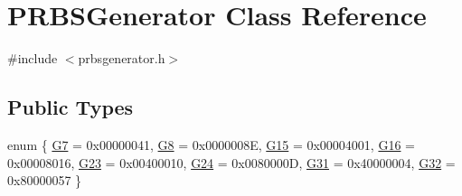 \hypertarget{classPRBSGenerator}{\section{\-P\-R\-B\-S\-Generator \-Class \-Reference}
\label{d6/db0/classPRBSGenerator}
}


{\ttfamily \#include $<$prbsgenerator.\-h$>$}

\subsection*{\-Public \-Types}
\begin{DoxyCompactItemize}
\item 
enum \{ \*
\hyperlink{classPRBSGenerator_a9c6fec99cf1a565c95e5e8488cdc4dbcacf570f7420964756a71bc150d4622563}{\-G7} =  0x00000041, 
\hyperlink{classPRBSGenerator_a9c6fec99cf1a565c95e5e8488cdc4dbca5ae6a89e9466218eeff42c23fccfc13f}{\-G8} =  0x0000008\-E, 
\hyperlink{classPRBSGenerator_a9c6fec99cf1a565c95e5e8488cdc4dbcad37981381999a9cedbcb07c5c506d7cc}{\-G15} =  0x00004001, 
\hyperlink{classPRBSGenerator_a9c6fec99cf1a565c95e5e8488cdc4dbca74d706cd120035b8ad5ade6afd4a764a}{\-G16} =  0x00008016, 
\*
\hyperlink{classPRBSGenerator_a9c6fec99cf1a565c95e5e8488cdc4dbca2c0916d9ea4f4f0a645dca7268dfe6f7}{\-G23} =  0x00400010, 
\hyperlink{classPRBSGenerator_a9c6fec99cf1a565c95e5e8488cdc4dbcae4c01340f8921a9cd5ccfe51299ef671}{\-G24} =  0x0080000\-D, 
\hyperlink{classPRBSGenerator_a9c6fec99cf1a565c95e5e8488cdc4dbcaa107bcb3d2c735cf3882b7e04759a5ad}{\-G31} =  0x40000004, 
\hyperlink{classPRBSGenerator_a9c6fec99cf1a565c95e5e8488cdc4dbca6af75e7a6681f228e4ff8757f62333ab}{\-G32} =  0x80000057
 \}
\end{DoxyCompactItemize}
